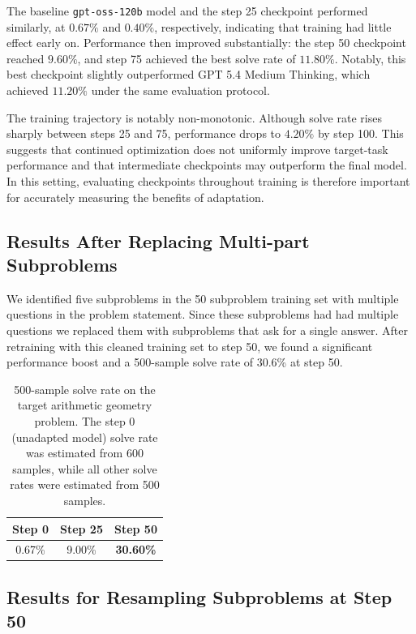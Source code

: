 \documentclass{article}
\begin{document}
The baseline \texttt{gpt-oss-120b} model and the step 25 checkpoint performed similarly, at $0.67\%$ and $0.40\%$, respectively, indicating that training had little effect early on. Performance then improved substantially: the step 50 checkpoint reached $9.60\%$, and step 75 achieved the best solve rate of $11.80\%$. Notably, this best checkpoint slightly outperformed GPT 5.4 Medium Thinking, which achieved $11.20\%$ under the same evaluation protocol.

The training trajectory is notably non-monotonic. Although solve rate rises sharply between steps 25 and 75, performance drops to $4.20\%$ by step 100. This suggests that continued optimization does not uniformly improve target-task performance and that intermediate checkpoints may outperform the final model. In this setting, evaluating checkpoints throughout training is therefore important for accurately measuring the benefits of adaptation.

\subsection{Results After Replacing Multi-part Subproblems}

We identified five subproblems in the 50 subproblem training set with multiple questions in the problem statement. Since these subproblems had had multiple questions we replaced them with subproblems that ask for a single answer. After retraining with this cleaned training set to step 50, we found a significant performance boost and a 500-sample solve rate of 30.6\% at step 50. 


\begin{table}[ht]
\centering
\begin{tabular}{|c|c|c|}
\hline
Step 0 & Step 25 & Step 50 \\
\hline
0.67\%  & 9.00\% & \textbf{30.60\%} \\
\hline
\end{tabular}
\caption{500-sample solve rate on the target arithmetic geometry problem. The step 0 (unadapted model) solve rate was estimated from 600 samples, while all other solve rates were estimated from 500 samples.}
\label{tab:example2}
\end{table}

\subsection{Results for Resampling Subproblems at Step 50}
\end{document}
